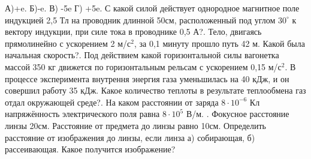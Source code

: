 \documentclass[12pt,a4paper,oneside]{article}
\begin{document}
А)+e. Б)-e. В) -5e Г) +5e. С какой силой действует однородное магнитное поле индукцией 2,5 Тл на проводник длинной 50см, расположенный под углом \(30^{\circ}\) к вектору индукции, при силе тока в проводнике 0,5 А?. Тело, двигаясь прямолинейно с ускорением 2 м/с\(^2\), за 0,1 минуту прошло путь 42 м. Какой была начальная скорость?. Под действием какой горизонтальной силы вагонетка массой 350 кг движется по горизонтальным рельсам с ускорением 0,15 м/с\(^2\). В процессе эксперимента внутрення энергия газа уменьшилась на 40 кДж, и он совершил работу 35 кДж. Какое количество теплоты в результате теплообмена газ отдал окружающей среде?. На каком расстоянии от заряда \(8 \cdot 10^{-6}\) Кл напряжённость электрического поля равна \(8 \cdot 10^5\) В/м. . Фокусное расстояние линзы 20см. Расстояние от предмета до линзы равно 10см. Определить расстояние от изображения до линзы, если линза а) собирающая, б) рассеивающая. Какое получится изображение?\newline
\end{document}
